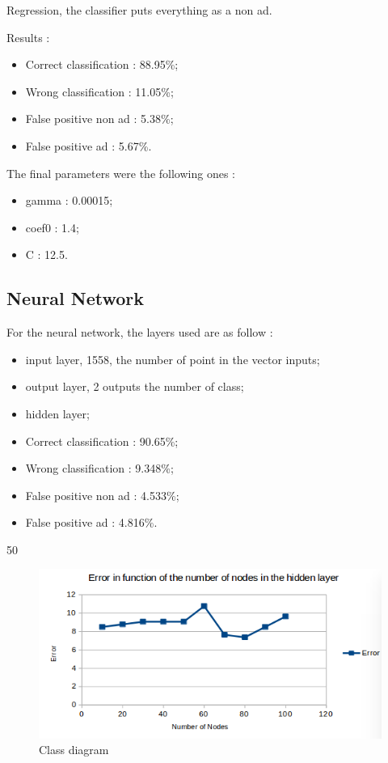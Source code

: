 Regression, the classifier puts everything as a non ad.

Results :
\begin{itemize}
  \item Correct classification : 88.95\%;
  \item Wrong classification : 11.05\%;
  \item False positive non ad : 5.38\%;
  \item False positive ad : 5.67\%.
\end{itemize}

The final parameters were the following ones :
\begin{itemize}
  \item gamma : 0.00015;
  \item coef0 : 1.4;
  \item C : 12.5.
\end{itemize}

\subsection{Neural Network}
For the neural network, the layers used are as follow :
  \begin{itemize}
    \item input layer, 1558, the number of point in the vector inputs;
    \item output layer, 2 outputs the number of class;
    \item hidden layer;
  \end{itemize}

  \begin{itemize}
    \item Correct classification : 90.65\%;
    \item Wrong classification : 9.348\%;
    \item False positive non ad : 4.533\%;
    \item False positive ad : 4.816\%.
  \end{itemize}

50
  \begin{figure}[h]
   \centering
   \includegraphics[scale=0.5]{../images/NNPO.png}
   \caption{Class diagram}
  \end{figure}
